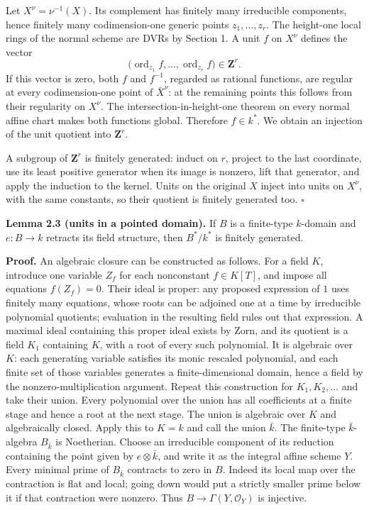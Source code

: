 \documentclass[11pt,a4paper,openany]{report}
\begin{document}
Let \(X^\nu=\nu^{-1}(X)\). Its complement has finitely many irreducible components, hence finitely many codimension-one generic points \(z_1,\ldots,z_r\). The height-one local rings of the normal scheme are DVRs by Section 1. A unit \(f\) on \(X^\nu\) defines the vector \[
  \bigl(\operatorname{ord}_{z_1}f,\ldots,
          \operatorname{ord}_{z_r}f\bigr)\in\mathbf Z^r.
  \] If this vector is zero, both \(f\) and \(f^{-1}\), regarded as rational functions, are regular at every codimension-one point of \(\bar X^\nu\): at the remaining points this follows from their regularity on \(X^\nu\). The intersection-in-height-one theorem on every normal affine chart makes both functions global. Therefore \(f\in k^*\). We obtain an injection of the unit quotient into \(\mathbf Z^r\).

A subgroup of \(\mathbf Z^r\) is finitely generated: induct on \(r\), project to the last coordinate, use its least positive generator when its image is nonzero, lift that generator, and apply the induction to the kernel. Units on the original \(X\) inject into units on \(X^\nu\), with the same constants, so their quotient is finitely generated too. \(\square\)

\textbf{Lemma 2.3 (units in a pointed domain).} If \(B\) is a finite-type \(k\)-domain and \(e:B\to k\) retracts its field structure, then \(B^*/k^*\) is finitely generated.

\textbf{Proof.} An algebraic closure can be constructed as follows. For a field \(K\), introduce one variable \(Z_f\) for each nonconstant \(f\in K[T]\), and impose all equations \(f(Z_f)=0\). Their ideal is proper: any proposed expression of \(1\) uses finitely many equations, whose roots can be adjoined one at a time by irreducible polynomial quotients; evaluation in the resulting field rules out that expression. A maximal ideal containing this proper ideal exists by Zorn, and its quotient is a field \(K_1\) containing \(K\), with a root of every such polynomial. It is algebraic over \(K\): each generating variable satisfies its monic rescaled polynomial, and each finite set of those variables generates a finite-dimensional domain, hence a field by the nonzero-multiplication argument. Repeat this construction for \(K_1,K_2,\ldots\) and take their union. Every polynomial over the union has all coefficients at a finite stage and hence a root at the next stage. The union is algebraic over \(K\) and algebraically closed. Apply this to \(K=k\) and call the union \(\bar k\). The finite-type \(\bar k\)-algebra \(B_{\bar k}\) is Noetherian. Choose an irreducible component of its reduction containing the point given by \(e\otimes\bar k\), and write it as the integral affine scheme \(Y\). Every minimal prime of \(B_{\bar k}\) contracts to zero in \(B\). Indeed its local map over the contraction is flat and local; going down would put a strictly smaller prime below it if that contraction were nonzero. Thus \(B\to\Gamma(Y,\mathcal O_Y)\) is injective.
\end{document}
